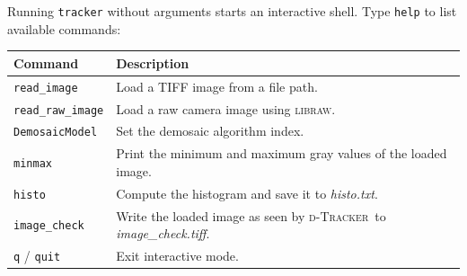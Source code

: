 \documentclass{simpledoc}
\newcommand{\soft}{\textsc{d-Tracker}}
\newcommand{\file}[1]{\textit{\color{myblue}#1}}
\newcommand{\screen}[1]{\texttt{\color{myblue}#1}}
\newcommand{\scr}[1]{\texttt{\color{myblue}#1}}
\begin{document}
Running \screen{tracker} without arguments starts an interactive shell.
Type \screen{help} to list available commands:

\begin{center}
\begin{tabular}{lp{7cm}}
\hline
\textbf{Command} & \textbf{Description} \\
\hline
\scr{read\_image}    & Load a TIFF image from a file path. \\
\scr{read\_raw\_image} & Load a raw camera image using \textsc{libraw}. \\
\scr{DemosaicModel}  & Set the demosaic algorithm index. \\
\scr{minmax}         & Print the minimum and maximum gray values of the loaded image. \\
\scr{histo}          & Compute the histogram and save it to \file{histo.txt}. \\
\scr{image\_check}   & Write the loaded image as seen by \soft\ to \file{image\_check.tiff}. \\
\scr{q} / \scr{quit} & Exit interactive mode. \\
\hline
\end{tabular}
\end{center}
\end{document}
